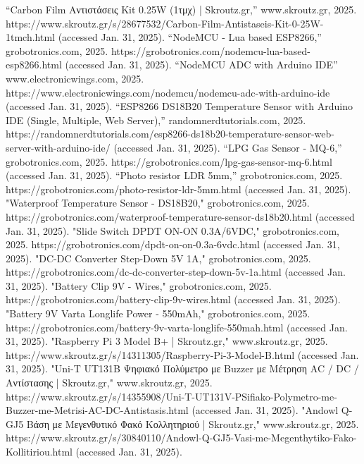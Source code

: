 \documentclass[conference]{IEEEtran}
\begin{document}
\begin{thebibliography}{00}
	 “Carbon Film Αντιστάσεις Kit 0.25W (1τμχ) | Skroutz.gr,” www.skroutz.gr, 2025. https://www.skroutz.gr/s/28677532/Carbon-Film-Antistaseis-Kit-0-25W-1tmch.html (accessed Jan. 31, 2025).
	 “NodeMCU - Lua based ESP8266,” grobotronics.com, 2025. https://grobotronics.com/nodemcu-lua-based-esp8266.html (accessed Jan. 31, 2025).
	 “NodeMCU ADC with Arduino IDE” www.electronicwings.com, 2025. https://www.electronicwings.com/nodemcu/nodemcu-adc-with-arduino-ide (accessed Jan. 31, 2025).
	 “ESP8266 DS18B20 Temperature Sensor with Arduino IDE (Single, Multiple, Web Server),” randomnerdtutorials.com, 2025. https://randomnerdtutorials.com/esp8266-ds18b20-temperature-sensor-web-server-with-arduino-ide/ (accessed Jan. 31, 2025).
	 “LPG Gas Sensor - MQ-6,” grobotronics.com, 2025. https://grobotronics.com/lpg-gas-sensor-mq-6.html (accessed Jan. 31, 2025).
	 “Photo resistor LDR 5mm,” grobotronics.com, 2025. https://grobotronics.com/photo-resistor-ldr-5mm.html (accessed Jan. 31, 2025).
	 "Waterproof Temperature Sensor - DS18B20," grobotronics.com, 2025. https://grobotronics.com/waterproof-temperature-sensor-ds18b20.html (accessed Jan. 31, 2025).
	 "Slide Switch DPDT ON-ON 0.3A/6VDC," grobotronics.com, 2025. https://grobotronics.com/dpdt-on-on-0.3a-6vdc.html (accessed Jan. 31, 2025).
	 "DC-DC Converter Step-Down 5V 1A," grobotronics.com, 2025. https://grobotronics.com/dc-dc-converter-step-down-5v-1a.html (accessed Jan. 31, 2025).
	 "Battery Clip 9V - Wires," grobotronics.com, 2025. https://grobotronics.com/battery-clip-9v-wires.html (accessed Jan. 31, 2025).
	 "Battery 9V Varta Longlife Power - 550mAh," grobotronics.com, 2025. https://grobotronics.com/battery-9v-varta-longlife-550mah.html (accessed Jan. 31, 2025).
	 "Raspberry Pi 3 Model B+ | Skroutz.gr," www.skroutz.gr, 2025. https://www.skroutz.gr/s/14311305/Raspberry-Pi-3-Model-B.html (accessed Jan. 31, 2025).
	 "Uni-T UT131Β Ψηφιακό Πολύμετρο με Buzzer με Μέτρηση AC / DC / Αντίστασης | Skroutz.gr," www.skroutz.gr, 2025. https://www.skroutz.gr/s/14355908/Uni-T-UT131V-PSifiako-Polymetro-me-Buzzer-me-Metrisi-AC-DC-Antistasis.html (accessed Jan. 31, 2025).
	 "Andowl Q-GJ5 Βάση με Μεγενθυτικό Φακό Κολλητηριού | Skroutz.gr," www.skroutz.gr, 2025. https://www.skroutz.gr/s/30840110/Andowl-Q-GJ5-Vasi-me-Megenthytiko-Fako-Kollitiriou.html (accessed Jan. 31, 2025).

\end{thebibliography}
\end{document}
